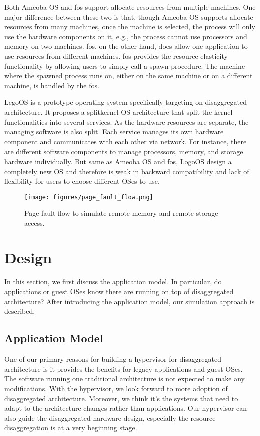 \documentclass[twocolumn]{article}
\begin{document}
Both Ameoba OS and fos support allocate resources from multiple machines. One major difference between these two is that, though Ameoba OS supports allocate resources from many machines, once the machine is selected, the process will only use the hardware components on it, e.g., the process cannot use processors and memory on two machines. fos, on the other hand, does allow one application to use resources from different machines. fos provides the resource elasticity functionality by allowing users to simply call a spawn procedure. The machine where the spawned process runs on, either on the same machine or on a different machine, is handled by the fos.

LegoOS\cite{LegoOS} is a prototype operating system specifically targeting on disaggregated architecture. It proposes a splitkernel OS architecture that split the kernel functionalities into several services. As the hardware resources are separate, the managing software is also split. Each service manages its own hardware component and communicates with each other via network. For instance, there are different software components to manage processors, memory, and storage hardware individually. But same as Ameoba OS and fos, LogoOS design a completely new OS and therefore is weak in backward compatibility and lack of flexibility for users to choose different OSes to use.

\begin{figure*}[h!]
     \centering
     \texttt{[image: figures/page\_fault\_flow.png]}
     \caption{Page fault flow to simulate remote memory and remote storage access.}
     \label{fig:page fault flow}
\end{figure*}

\section{Design}
In this section, we first discuss the application model. In particular, do applications or guest OSes know there are running on top of disaggregated architecture? After introducing the application model, our simulation approach is described.

\subsection{Application Model}
One of our primary reasons for building a hypervisor for disaggregated architecture is it provides the benefits for legacy applications and guest OSes. The software running one traditional architecture is not expected to make any modifications. With the hypervisor, we look forward to more adoption of disaggregated architecture. Moreover, we think it's the systems that need to adapt to the architecture changes rather than applications. Our hypervisor can also guide the disaggregated hardware design, especially the resource disaggregation is at a very beginning stage.
\end{document}
